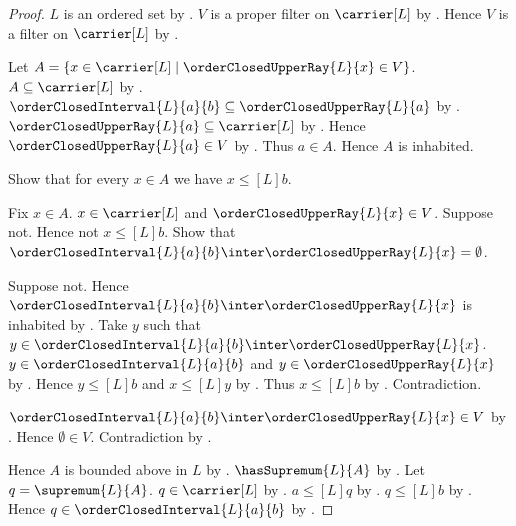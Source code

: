 \begin{proof}
    $L$ is an ordered set by
        .
    $V$ is a proper filter on $\carrier[L]$ by
        .
    Hence $V$ is a filter on $\carrier[L]$ by
        .

    Let $A=\{x\in\carrier[L]\mid
        \orderClosedUpperRay{L}{x}\in V\}$.
    $A\subseteq\carrier[L]$ by .
    $\orderClosedInterval{L}{a}{b}
        \subseteq\orderClosedUpperRay{L}{a}$ by
        .
    $\orderClosedUpperRay{L}{a}\subseteq\carrier[L]$ by
        .
    Hence $\orderClosedUpperRay{L}{a}\in V$ by .
    Thus $a\in A$.
    Hence $A$ is inhabited.

    Show that for every $x\in A$ we have $x\mathrel{\leq[L]}b$.
    \begin{subproof}
        Fix $x\in A$.
        $x\in\carrier[L]$ and
            $\orderClosedUpperRay{L}{x}\in V$.
        Suppose not.
        Hence not $x\mathrel{\leq[L]}b$.
        Show that
            $\orderClosedInterval{L}{a}{b}\inter
                \orderClosedUpperRay{L}{x}=\emptyset$.
        \begin{subproof}
            Suppose not.
            Hence $\orderClosedInterval{L}{a}{b}\inter
                \orderClosedUpperRay{L}{x}$ is inhabited by
                .
            Take $y$ such that
                $y\in\orderClosedInterval{L}{a}{b}\inter
                    \orderClosedUpperRay{L}{x}$.
            $y\in\orderClosedInterval{L}{a}{b}$ and
                $y\in\orderClosedUpperRay{L}{x}$ by .
            Hence $y\mathrel{\leq[L]}b$ and
                $x\mathrel{\leq[L]}y$ by
                .
            Thus $x\mathrel{\leq[L]}b$ by
                .
            Contradiction.
        \end{subproof}
        $\orderClosedInterval{L}{a}{b}\inter
            \orderClosedUpperRay{L}{x}\in V$ by .
        Hence $\emptyset\in V$.
        Contradiction by .
    \end{subproof}
    Hence $A$ is bounded above in $L$ by
        .
    $\hasSupremum{L}{A}$ by
        .
    Let $q=\supremum{L}{A}$.
    $q\in\carrier[L]$ by .
    $a\mathrel{\leq[L]}q$ by .
    $q\mathrel{\leq[L]}b$ by .
    Hence $q\in\orderClosedInterval{L}{a}{b}$ by
        .


\end{proof}
